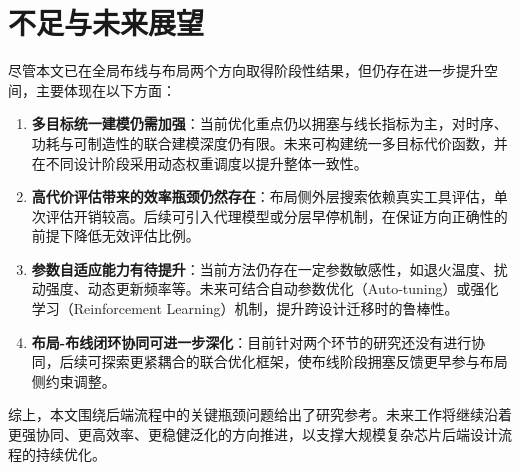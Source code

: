 \section{不足与未来展望}

尽管本文已在全局布线与布局两个方向取得阶段性结果，但仍存在进一步提升空间，主要体现在以下方面：
\begin{enumerate}
	\item \textbf{多目标统一建模仍需加强}：当前优化重点仍以拥塞与线长指标为主，对时序、功耗与可制造性的联合建模深度仍有限。未来可构建统一多目标代价函数，并在不同设计阶段采用动态权重调度以提升整体一致性。
	\item \textbf{高代价评估带来的效率瓶颈仍然存在}：布局侧外层搜索依赖真实工具评估，单次评估开销较高。后续可引入代理模型或分层早停机制，在保证方向正确性的前提下降低无效评估比例。
	\item \textbf{参数自适应能力有待提升}：当前方法仍存在一定参数敏感性，如退火温度、扰动强度、动态更新频率等。未来可结合自动参数优化（Auto-tuning）或强化学习（Reinforcement Learning）机制，提升跨设计迁移时的鲁棒性。
	\item \textbf{布局-布线闭环协同可进一步深化}：目前针对两个环节的研究还没有进行协同，后续可探索更紧耦合的联合优化框架，使布线阶段拥塞反馈更早参与布局侧约束调整。
\end{enumerate}

综上，本文围绕后端流程中的关键瓶颈问题给出了研究参考。未来工作将继续沿着更强协同、更高效率、更稳健泛化的方向推进，以支撑大规模复杂芯片后端设计流程的持续优化。

